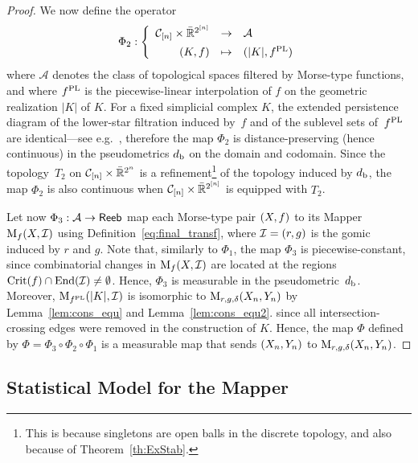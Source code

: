 \begin{proof}
We now define the operator
$$ 
\Phi_{2} :
\left\{
\begin{array}{rcl} 
     \mathcal{C}_{[n]}  \times   \bar{\mathbb{R}}^{2^{[n]}}   &   \rightarrow & \mathcal{A} \quad        \\[0.5em]
 (K,f)  & \mapsto &	(|K|,{f}^{\rm PL}) 
 \end{array} 
\right.
 $$ 
%
where $\mathcal{A}$ denotes the class of topological spaces filtered
by Morse-type functions, and where ${f}^{\rm PL}$ is the
piecewise-linear interpolation of $f$ on the geometric
realization $|K|$ of $K$.
For a fixed simplicial complex $K$, the extended persistence diagram of the lower-star filtration induced by~$f$
and of the sublevel sets of~${f}^{\rm PL}$ are identical---see e.g.~\cite{Morozov08}, therefore the map $\Phi_{2}$ is
distance-preserving (hence continuous) in the pseudometrics
$d_{\rm b}$ on the domain and codomain. Since the topology~$T_2$ on
$\mathcal{C}_{[n]} \times \bar{\mathbb{R}}^{2^n}$ is a
refinement\footnote{This is because singletons are open balls in the
  discrete topology, and also because of Theorem~\ref{th:ExStab}. 
} of
the topology induced by $d_{\rm b}$, the map $\Phi_2$ is also
continuous when $\mathcal{C}_{[n]} \times \bar{\mathbb{R}}^{2^{[n]}}$ is
equipped with $T_2$.

Let now $\Phi_3: \mathcal{A}\to {\sf Reeb}$ map each Morse-type pair
$(X,f)$ to its Mapper $\mathrm{M}_{f}(X,\mathcal{I})$ using Definition~\ref{eq:final_transf}, where $\mathcal{I}=(r,g)$
is the gomic induced by $r$ and $g$.
Note that, similarly to $\Phi_1$, the map $\Phi_3$ is piecewise-constant, 
since combinatorial changes in $\mathrm{M}_{f}(X,\mathcal{I})$ 
are located at the regions $\mathrm{Crit}(f)\cap {\rm End}(\mathcal{I})\neq\emptyset$. 
Hence, $\Phi_3$ is measurable in the pseudometric~$d_{\rm b}$. 
Moreover, $\mathrm{M}_{{f}^{\rm PL}}(|K|,\mathcal{I})$ is isomorphic to 
$\mathrm{M}_{r,g,\delta}(X_n, Y_n)$ 
by Lemma~\ref{lem:cons_equ} and Lemma~\ref{lem:cons_equ2}. %
since all intersection-crossing edges were removed in the construction of $K$.
Hence, the map $\Phi$ defined by $\Phi=\Phi_3\circ\Phi_2\circ\Phi_1$ is a measurable map 
that sends $(X_n,Y_n)$ to $\mathrm{M}_{r,g,\delta}(X_n,Y_n)$.
\end{proof}









\subsection{Statistical Model for the Mapper}
\label{sec:ModelStat}

